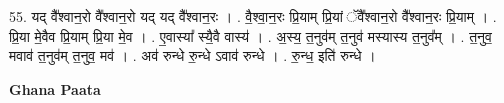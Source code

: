 \documentclass[17pt]{extarticle}
\begin{document}
55. यद् वै᳚श्वान॒रो वै᳚श्वान॒रो यद् यद् वै᳚श्वान॒रः । . वै॒श्वा॒न॒रः प्रि॒याम् प्रि॒यां ॅवै᳚श्वान॒रो वै᳚श्वान॒रः प्रि॒याम् । . प्रि॒या मे॒वैव प्रि॒याम् प्रि॒या मे॒व । . ए॒वास्या᳚ स्यै॒वै वास्य॑ । . अ॒स्य॒ त॒नुव॑म् त॒नुव॑ मस्यास्य त॒नुव᳚म् । . त॒नुव॒ मवाव॑ त॒नुव॑म् त॒नुव॒ मव॑ । . अव॑ रुन्धे रु॒न्धे ऽवाव॑ रुन्धे । . रु॒न्ध॒ इति॑ रुन्धे । \newline

\textbf{Ghana Paata } \newline
\end{document}
